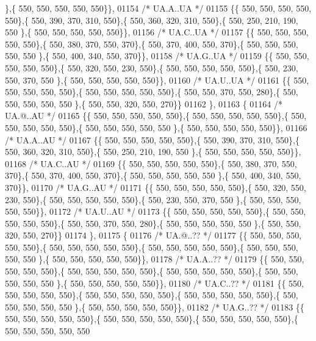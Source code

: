 \begin{DoxyCode}
      \},\{ 550, 550, 550, 550, 550\}\},
01154 \textcolor{comment}{/* UA.A..UA */}
01155 \{\{ 550, 550, 550, 550, 550\},\{ 550, 390, 370, 310, 550\},\{ 550, 360, 320, 310, 550\},\{ 550, 250, 210, 190, 550
      \},\{ 550, 550, 550, 550, 550\}\},
01156 \textcolor{comment}{/* UA.C..UA */}
01157 \{\{ 550, 550, 550, 550, 550\},\{ 550, 380, 370, 550, 370\},\{ 550, 370, 400, 550, 370\},\{ 550, 550, 550, 550, 550
      \},\{ 550, 400, 340, 550, 370\}\},
01158 \textcolor{comment}{/* UA.G..UA */}
01159 \{\{ 550, 550, 550, 550, 550\},\{ 550, 320, 550, 230, 550\},\{ 550, 550, 550, 550, 550\},\{ 550, 230, 550, 370, 550
      \},\{ 550, 550, 550, 550, 550\}\},
01160 \textcolor{comment}{/* UA.U..UA */}
01161 \{\{ 550, 550, 550, 550, 550\},\{ 550, 550, 550, 550, 550\},\{ 550, 550, 370, 550, 280\},\{ 550, 550, 550, 550, 550
      \},\{ 550, 550, 320, 550, 270\}\}
01162 \},
01163 \{
01164 \textcolor{comment}{/* UA.@..AU */}
01165 \{\{ 550, 550, 550, 550, 550\},\{ 550, 550, 550, 550, 550\},\{ 550, 550, 550, 550, 550\},\{ 550, 550, 550, 550, 550
      \},\{ 550, 550, 550, 550, 550\}\},
01166 \textcolor{comment}{/* UA.A..AU */}
01167 \{\{ 550, 550, 550, 550, 550\},\{ 550, 390, 370, 310, 550\},\{ 550, 360, 320, 310, 550\},\{ 550, 250, 210, 190, 550
      \},\{ 550, 550, 550, 550, 550\}\},
01168 \textcolor{comment}{/* UA.C..AU */}
01169 \{\{ 550, 550, 550, 550, 550\},\{ 550, 380, 370, 550, 370\},\{ 550, 370, 400, 550, 370\},\{ 550, 550, 550, 550, 550
      \},\{ 550, 400, 340, 550, 370\}\},
01170 \textcolor{comment}{/* UA.G..AU */}
01171 \{\{ 550, 550, 550, 550, 550\},\{ 550, 320, 550, 230, 550\},\{ 550, 550, 550, 550, 550\},\{ 550, 230, 550, 370, 550
      \},\{ 550, 550, 550, 550, 550\}\},
01172 \textcolor{comment}{/* UA.U..AU */}
01173 \{\{ 550, 550, 550, 550, 550\},\{ 550, 550, 550, 550, 550\},\{ 550, 550, 370, 550, 280\},\{ 550, 550, 550, 550, 550
      \},\{ 550, 550, 320, 550, 270\}\}
01174 \},
01175 \{
01176 \textcolor{comment}{/* UA.@..?? */}
01177 \{\{ 550, 550, 550, 550, 550\},\{ 550, 550, 550, 550, 550\},\{ 550, 550, 550, 550, 550\},\{ 550, 550, 550, 550, 550
      \},\{ 550, 550, 550, 550, 550\}\},
01178 \textcolor{comment}{/* UA.A..?? */}
01179 \{\{ 550, 550, 550, 550, 550\},\{ 550, 550, 550, 550, 550\},\{ 550, 550, 550, 550, 550\},\{ 550, 550, 550, 550, 550
      \},\{ 550, 550, 550, 550, 550\}\},
01180 \textcolor{comment}{/* UA.C..?? */}
01181 \{\{ 550, 550, 550, 550, 550\},\{ 550, 550, 550, 550, 550\},\{ 550, 550, 550, 550, 550\},\{ 550, 550, 550, 550, 550
      \},\{ 550, 550, 550, 550, 550\}\},
01182 \textcolor{comment}{/* UA.G..?? */}
01183 \{\{ 550, 550, 550, 550, 550\},\{ 550, 550, 550, 550, 550\},\{ 550, 550, 550, 550, 550\},\{ 550, 550, 550, 550, 550

\end{DoxyCode}
